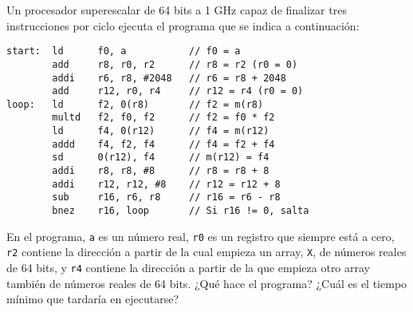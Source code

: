 \begin{ejercicio}
    Un procesador superescalar de 64 bits a 1 GHz capaz de finalizar tres instrucciones por ciclo ejecuta el programa que se indica a continuación:
    \begin{verbatim}
start:  ld      f0, a           // f0 = a
        add     r8, r0, r2      // r8 = r2 (r0 = 0)
        addi    r6, r8, #2048   // r6 = r8 + 2048
        add     r12, r0, r4     // r12 = r4 (r0 = 0)
loop:   ld      f2, 0(r8)       // f2 = m(r8)
        multd   f2, f0, f2      // f2 = f0 * f2
        ld      f4, 0(r12)      // f4 = m(r12)
        addd    f4, f2, f4      // f4 = f2 + f4
        sd      0(r12), f4      // m(r12) = f4
        addi    r8, r8, #8      // r8 = r8 + 8
        addi    r12, r12, #8    // r12 = r12 + 8
        sub     r16, r6, r8     // r16 = r6 - r8
        bnez    r16, loop       // Si r16 != 0, salta
    \end{verbatim}

    En el programa, \verb|a| es un número real, \verb|r0| es un registro que siempre está a cero, \verb|r2| contiene la dirección a partir de la cual empieza un array, \verb|X|, de números reales de 64 bits, y \verb|r4| contiene la dirección a partir de la que empieza otro array también de números reales de 64 bits. ¿Qué hace el programa? ¿Cuál es el tiempo mínimo que tardaría en ejecutarse?

\end{ejercicio}



\newpage
